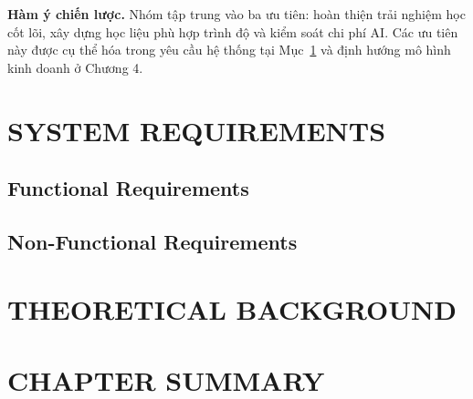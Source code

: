 \noindent\textbf{Hàm ý chiến lược.}
Nhóm tập trung vào ba ưu tiên: hoàn thiện trải nghiệm học cốt lõi, xây dựng học liệu phù hợp trình độ và kiểm soát chi phí AI. Các ưu tiên này được cụ thể hóa trong yêu cầu hệ thống tại Mục~\ref{sec:system-requirements} và định hướng mô hình kinh doanh ở Chương 4.

\section{SYSTEM REQUIREMENTS}
\label{sec:system-requirements}
\subsection{Functional Requirements}
\label{sec:functional-requirements}

\subsection{Non-Functional Requirements}
\section{THEORETICAL BACKGROUND}
\section{CHAPTER SUMMARY}
